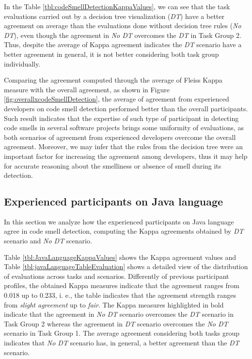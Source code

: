 In the Table \ref{tbl:codeSmellDetectionKappaValues}, we can see that the task evaluations carried out by a decision tree visualization (\textit{DT}) have a better agreement on average than the evaluations done without decision tree rules (\textit{No DT}), even though the agreement in \textit{No DT} overcomes the \textit{DT} in Task Group 2. Thus, despite the average of Kappa agreement indicates the \textit{DT} scenario have a better agreement in general, it is not better considering both task group individually.

Comparing the agreement computed through the average of Fleiss Kappa measure with the overall agreement, as shown in Figure \ref{fig:overallxcodeSmellDetection}, the average of agreement from experienced developers on code smell detection performed better than the overall participants. Such result indicates that the expertise of such type of participant in detecting code smells in several software projects brings some uniformity of evaluations, as both scenarios of agreement from experienced developers overcome the overall agreement. Moreover, we may infer that the rules from the decision tree were an important factor for increasing the agreement among developers, thus it may help for accurate reasoning about the smelliness or absence of smell during its detection. 

\subsection{Experienced participants on Java language} \label{sec:participantsJavaAgreement}    

In this section we analyze how the experienced participants on Java language agree in code smell detection, computing the Kappa agreements obtained by \textit{DT} scenario and \textit{No DT} scenario.

Table \ref{tbl:JavaLanguageKappaValues} shows the Kappa agreement values and Table \ref{tbl:javaLanguageTableEvaluation} shows a detailed view of the distribution of evaluations across tasks and scenarios. Differently of previous participant profiles, the obtained Kappa measures indicate that the agreement ranges from 0.018 up to 0.233, i. e., the table indicates that the agreement strength ranges from \textit{slight agreement} up to \textit{fair}. The Kappa measures highlighted in bold indicate that the agreement in \textit{No DT} scenario overcomes the \textit{DT} scenario in Task Group 2 whereas the agreement in \textit{DT} scenario overcomes the \textit{No DT} scenario in Task Group 1. The average agreement considering both tasks group indicates that \textit{No DT} scenario has, in general, a better agreement than the \textit{DT} scenario. 

